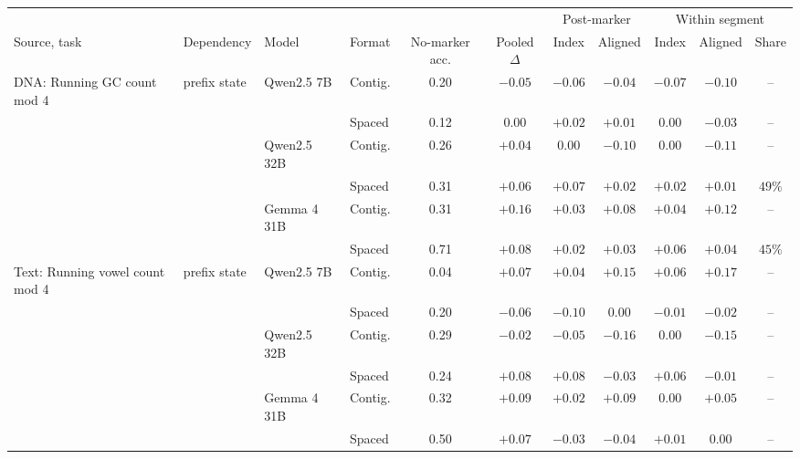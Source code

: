 \begin{tabular}{llll cc cc cc c}
\toprule
& & & & & & \multicolumn{2}{c}{Post-marker} & \multicolumn{3}{c}{Within segment} \\
\cmidrule(lr){7-8}\cmidrule(lr){9-11}
Source, task & Dependency & Model & Format & No-marker acc. & Pooled $\Delta$ & Index & Aligned & Index & Aligned & Share \\
\midrule
DNA: Running GC count mod 4 & prefix state & Qwen2.5 7B & Contig. & 0.20 & $-0.05$ & $-0.06$ & $-0.04$ & $-0.07$ & $-0.10$ & -- \\
 &  &  & Spaced & 0.12 & $0.00$ & $+0.02$ & $+0.01$ & $0.00$ & $-0.03$ & -- \\
 &  & Qwen2.5 32B & Contig. & 0.26 & $+0.04$ & $0.00$ & $-0.10$ & $0.00$ & $-0.11$ & -- \\
 &  &  & Spaced & 0.31 & $+0.06$ & $+0.07$ & $+0.02$ & $+0.02$ & $+0.01$ & $49\%$ \\
 &  & Gemma 4 31B & Contig. & 0.31 & $+0.16$ & $+0.03$ & $+0.08$ & $+0.04$ & $+0.12$ & -- \\
 &  &  & Spaced & 0.71 & $+0.08$ & $+0.02$ & $+0.03$ & $+0.06$ & $+0.04$ & $45\%$ \\
\addlinespace
Text: Running vowel count mod 4 & prefix state & Qwen2.5 7B & Contig. & 0.04 & $+0.07$ & $+0.04$ & $+0.15$ & $+0.06$ & $+0.17$ & -- \\
 &  &  & Spaced & 0.20 & $-0.06$ & $-0.10$ & $0.00$ & $-0.01$ & $-0.02$ & -- \\
 &  & Qwen2.5 32B & Contig. & 0.29 & $-0.02$ & $-0.05$ & $-0.16$ & $0.00$ & $-0.15$ & -- \\
 &  &  & Spaced & 0.24 & $+0.08$ & $+0.08$ & $-0.03$ & $+0.06$ & $-0.01$ & -- \\
 &  & Gemma 4 31B & Contig. & 0.32 & $+0.09$ & $+0.02$ & $+0.09$ & $0.00$ & $+0.05$ & -- \\
 &  &  & Spaced & 0.50 & $+0.07$ & $-0.03$ & $-0.04$ & $+0.01$ & $0.00$ & -- \\
\bottomrule
\end{tabular}
